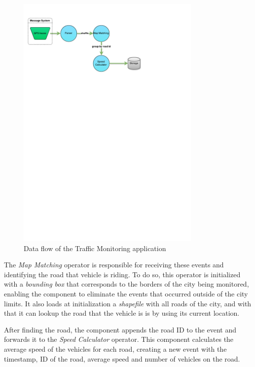 \documentclass[ppgc,diss,english]{iiufrgs}
\begin{document}
\begin{figure}[!ht]
	\centering
	\includegraphics[width=0.8\textwidth]{images/apps/TrafficMonitoring.pdf}
	\caption{Data flow of the Traffic Monitoring application}
	\label{fig:app_traffic_monitoring}
\end{figure}

The \emph{Map Matching} operator is responsible for receiving these events and identifying the road that vehicle is riding. To do so, this operator is initialized with a \emph{bounding box} that corresponds to the borders of the city being monitored, enabling the component to eliminate the events that occurred outside of the city limits. It also loads at initialization a \emph{shapefile} with all roads of the city, and with that it can lookup the road that the vehicle is is by using its current location.

After finding the road, the component appends the road ID to the event and forwards it to the \emph{Speed Calculator} operator. This component calculates the average speed of the vehicles for each road, creating a new event with the timestamp, ID of the road, average speed and number of vehicles on the road.
\end{document}

